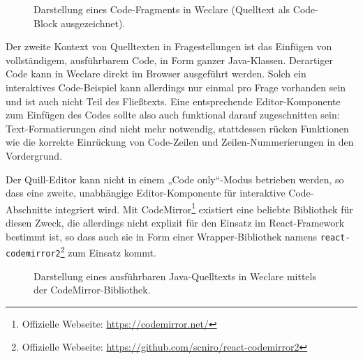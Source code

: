 \begin{figure}[H]
    \centering
    \setlength{\fboxsep}{0pt}
    \setlength{\fboxrule}{0.5pt}
    \caption[Darstellung eines Code-Fragments in Weclare]{Darstellung eines Code-Fragments in Weclare (Quelltext als Code-Block ausgezeichnet).}
    \label{abb:weclare_code_fragment}
\end{figure}

Der zweite Kontext von Quelltexten in Fragestellungen ist das Einfügen von vollständigem, ausführbarem Code, in Form ganzer Java-Klassen. Derartiger Code kann in Weclare direkt im Browser ausgeführt werden. Solch ein interaktives Code-Beispiel kann allerdings nur einmal pro Frage vorhanden sein und ist auch nicht Teil des Fließtexts. Eine entsprechende Editor-Komponente zum Einfügen des Codes sollte also auch funktional darauf zugeschnitten sein: Text-Formatierungen sind nicht mehr notwendig, stattdessen rücken Funktionen wie die korrekte Einrückung von Code-Zeilen und Zeilen-Nummerierungen in den Vordergrund.

Der Quill-Editor kann nicht in einem „Code only“-Modus betrieben werden, so dass eine zweite, unabhängige Editor-Komponente für interaktive Code-Abschnitte integriert wird. Mit CodeMirror\footnote{Offizielle Webseite: \url{https://codemirror.net/}} existiert eine beliebte Bibliothek für diesen Zweck, die allerdings nicht explizit für den Einsatz im React-Framework bestimmt ist, so dass auch sie in Form einer Wrapper-Bibliothek namens \texttt{react-codemirror2}\footnote{Offizielle Webseite: \url{https://github.com/scniro/react-codemirror2}} zum Einsatz kommt.



\begin{figure}[H]
    \centering
    \setlength{\fboxsep}{0pt}
    \setlength{\fboxrule}{0.5pt}
    \caption[Darstellung eines ausführbaren Java-Quelltexts in Weclare]{Darstellung eines ausführbaren Java-Quelltexts in Weclare mittels der CodeMirror-Bibliothek.}
    \label{abb:weclare_codemirror}
\end{figure}